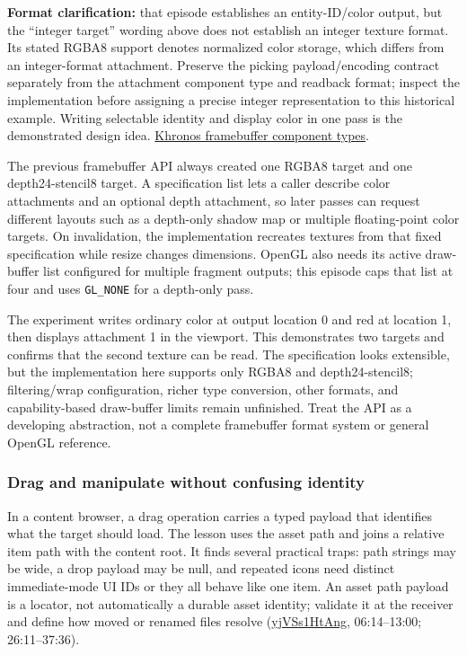 \textbf{Format clarification:} that episode establishes an entity-ID/color output, but the ``integer target'' wording above does not establish an integer texture format. Its stated RGBA8 support denotes normalized color storage, which differs from an integer-format attachment. Preserve the picking payload/encoding contract separately from the attachment component type and readback format; inspect the implementation before assigning a precise integer representation to this historical example. Writing selectable identity and display color in one pass is the demonstrated design idea. \href{https://registry.khronos.org/OpenGL/specs/gl/glspec30.pdf}{Khronos framebuffer component types}.

The previous framebuffer API always created one RGBA8 target and one depth24-stencil8 target. A specification list lets a caller describe color attachments and an optional depth attachment, so later passes can request different layouts such as a depth-only shadow map or multiple floating-point color targets. On invalidation, the implementation recreates textures from that fixed specification while resize changes dimensions. OpenGL also needs its active draw-buffer list configured for multiple fragment outputs; this episode caps that list at four and uses \texttt{GL\_NONE} for a depth-only pass.

The experiment writes ordinary color at output location 0 and red at location 1, then displays attachment 1 in the viewport. This demonstrates two targets and confirms that the second texture can be read. The specification looks extensible, but the implementation here supports only RGBA8 and depth24-stencil8; filtering/wrap configuration, richer type conversion, other formats, and capability-based draw-buffer limits remain unfinished. Treat the API as a developing abstraction, not a complete framebuffer format system or general OpenGL reference.

\subsubsection{Drag and manipulate without confusing identity}\label{drag-and-manipulate-without-confusing-identity}

In a content browser, a drag operation carries a typed payload that identifies what the target should load. The lesson uses the asset path and joins a relative item path with the content root. It finds several practical traps: path strings may be wide, a drop payload may be null, and repeated icons need distinct immediate-mode UI IDs or they all behave like one item. An asset path payload is a locator, not automatically a durable asset identity; validate it at the receiver and define how moved or renamed files resolve (\href{https://www.youtube.com/watch?v=yjVSs1HtAng}{yjVSs1HtAng}, 06:14--13:00; 26:11--37:36).

